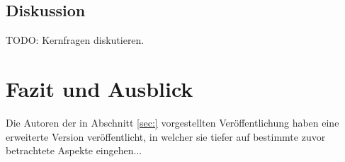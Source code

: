 \documentclass[12pt, a4paper]{article}
\begin{document}
\vfill
\pagebreak

\subsection{Diskussion}

TODO: Kernfragen diskutieren.

\pagebreak

\section{Fazit und Ausblick}

Die Autoren der in Abschnitt \ref{sec:} vorgestellten Veröffentlichung haben eine erweiterte Version veröffentlicht,
in welcher sie tiefer auf bestimmte zuvor betrachtete Aspekte eingehen...

\vfill
\pagebreak


%

\end{document}
